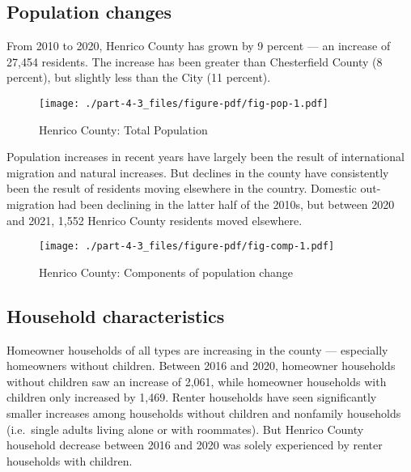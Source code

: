 \documentclass[
  letterpaper,
  DIV=11,
  numbers=noendperiod]{scrreprt}
\begin{document}
\hypertarget{population-changes-2}{%
\subsection{Population changes}\label{population-changes-2}}

From 2010 to 2020, Henrico County has grown by 9 percent --- an increase
of 27,454 residents. The increase has been greater than Chesterfield
County (8 percent), but slightly less than the City (11 percent).

\begin{figure}

{\centering \texttt{[image: ./part-4-3\_files/figure-pdf/fig-pop-1.pdf]}

}

\caption{\label{fig-pop}Henrico County: Total Population}

\end{figure}

Population increases in recent years have largely been the result of
international migration and natural increases. But declines in the
county have consistently been the result of residents moving elsewhere
in the country. Domestic out-migration had been declining in the latter
half of the 2010s, but between 2020 and 2021, 1,552 Henrico County
residents moved elsewhere.

\begin{figure}

{\centering \texttt{[image: ./part-4-3\_files/figure-pdf/fig-comp-1.pdf]}

}

\caption{\label{fig-comp}Henrico County: Components of population
change}

\end{figure}

\hypertarget{household-characteristics-2}{%
\subsection{Household
characteristics}\label{household-characteristics-2}}

Homeowner households of all types are increasing in the county ---
especially homeowners without children. Between 2016 and 2020, homeowner
households without children saw an increase of 2,061, while homeowner
households with children only increased by 1,469. Renter households have
seen significantly smaller increases among households without children
and nonfamily households (i.e.~single adults living alone or with
roommates). But Henrico County household decrease between 2016 and 2020
was solely experienced by renter households with children.
\end{document}
